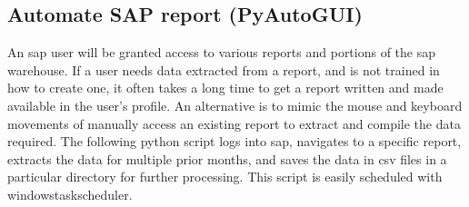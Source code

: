 \documentclass[10pt, letterpaper, twoside]{article}
\begin{document}
\subsection{Automate SAP report (PyAutoGUI)}\label{sec:automate_sap_report}
An \Gls{sap} user will be granted access to various reports and portions of the \Gls{sap} warehouse. If a user needs data extracted from a report, and is not trained in how to create one, it often takes a long time to get a report written and made available in the user's profile. An alternative is to mimic the mouse and keyboard movements of manually access an existing report to extract and compile the data required. The following \Gls{python} script logs into \Gls{sap}, navigates to a specific report, extracts the data for multiple prior months, and saves the data in csv files in a particular directory for further processing. This script is easily scheduled with \Gls{windowstaskscheduler}.
\end{document}
